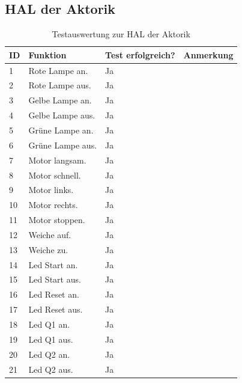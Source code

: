 \documentclass[a4paper, 11pt]{article}
\begin{document}
\subsection{HAL der Aktorik}
\begin{table}[H]
\center
    \begin{tabularx}{\textwidth}{|l|X|X|X|}
        \hline
        \textbf{ID}&\textbf{Funktion}&\textbf{Test erfolgreich?}&\textbf{Anmerkung}\\
        \hline
        1&Rote Lampe an.&Ja&\\
        \hline
        2&Rote Lampe aus.&Ja&\\
        \hline
        3&Gelbe Lampe an.&Ja&\\
        \hline
        4&Gelbe Lampe aus.&Ja&\\
        \hline
        5&Grüne Lampe an.&Ja&\\
        \hline
        6&Grüne Lampe aus.&Ja&\\
        \hline
        7&Motor langsam.&Ja&\\
        \hline
        8&Motor schnell.&Ja&\\
        \hline
        9&Motor links.&Ja&\\
        \hline
        10&Motor rechts.&Ja&\\
        \hline
        11&Motor stoppen.&Ja&\\
        \hline
        12&Weiche auf.&Ja&\\
        \hline
        13&Weiche zu.&Ja&\\
        \hline
        14&Led Start an.&Ja&\\
        \hline
        15&Led Start aus.&Ja&\\
        \hline
        16&Led Reset an.&Ja&\\
        \hline
        17&Led Reset aus.&Ja&\\
        \hline
        18&Led Q1 an.&Ja&\\
        \hline
        19&Led Q1 aus.&Ja&\\
        \hline
        20&Led Q2 an.&Ja&\\
        \hline
        21&Led Q2 aus.&Ja&\\
        \hline
    \end{tabularx}
    \caption{Testauswertung zur HAL der Aktorik}
    \label{tsthal}
\end{table}

\newpage
\end{document}
